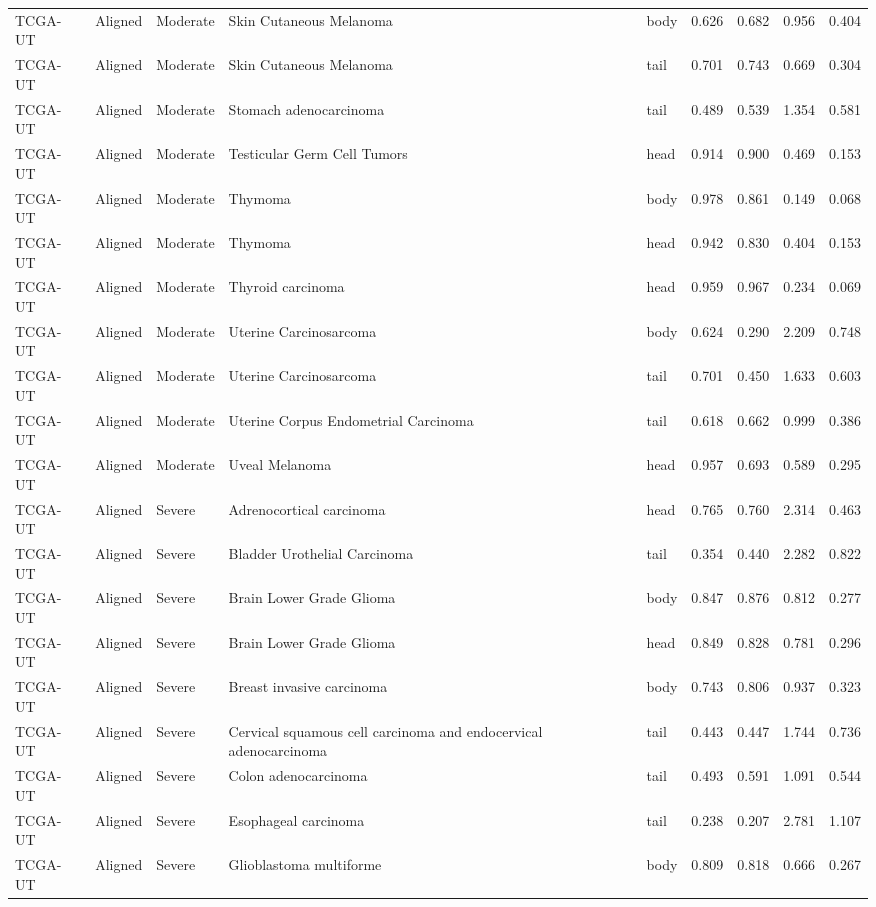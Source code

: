 \begin{longtable}{lllllrrrr}
TCGA-UT & Aligned & Moderate & Skin Cutaneous Melanoma & body & 0.626 & 0.682 & 0.956 & 0.404 \\
TCGA-UT & Aligned & Moderate & Skin Cutaneous Melanoma & tail & 0.701 & 0.743 & 0.669 & 0.304 \\
TCGA-UT & Aligned & Moderate & Stomach adenocarcinoma & tail & 0.489 & 0.539 & 1.354 & 0.581 \\
TCGA-UT & Aligned & Moderate & Testicular Germ Cell Tumors & head & 0.914 & 0.900 & 0.469 & 0.153 \\
TCGA-UT & Aligned & Moderate & Thymoma & body & 0.978 & 0.861 & 0.149 & 0.068 \\
TCGA-UT & Aligned & Moderate & Thymoma & head & 0.942 & 0.830 & 0.404 & 0.153 \\
TCGA-UT & Aligned & Moderate & Thyroid carcinoma & head & 0.959 & 0.967 & 0.234 & 0.069 \\
TCGA-UT & Aligned & Moderate & Uterine Carcinosarcoma & body & 0.624 & 0.290 & 2.209 & 0.748 \\
TCGA-UT & Aligned & Moderate & Uterine Carcinosarcoma & tail & 0.701 & 0.450 & 1.633 & 0.603 \\
TCGA-UT & Aligned & Moderate & Uterine Corpus Endometrial Carcinoma & tail & 0.618 & 0.662 & 0.999 & 0.386 \\
TCGA-UT & Aligned & Moderate & Uveal Melanoma & head & 0.957 & 0.693 & 0.589 & 0.295 \\
TCGA-UT & Aligned & Severe & Adrenocortical carcinoma & head & 0.765 & 0.760 & 2.314 & 0.463 \\
TCGA-UT & Aligned & Severe & Bladder Urothelial Carcinoma & tail & 0.354 & 0.440 & 2.282 & 0.822 \\
TCGA-UT & Aligned & Severe & Brain Lower Grade Glioma & body & 0.847 & 0.876 & 0.812 & 0.277 \\
TCGA-UT & Aligned & Severe & Brain Lower Grade Glioma & head & 0.849 & 0.828 & 0.781 & 0.296 \\
TCGA-UT & Aligned & Severe & Breast invasive carcinoma & body & 0.743 & 0.806 & 0.937 & 0.323 \\
TCGA-UT & Aligned & Severe & Cervical squamous cell carcinoma and endocervical adenocarcinoma & tail & 0.443 & 0.447 & 1.744 & 0.736 \\
TCGA-UT & Aligned & Severe & Colon adenocarcinoma & tail & 0.493 & 0.591 & 1.091 & 0.544 \\
TCGA-UT & Aligned & Severe & Esophageal carcinoma & tail & 0.238 & 0.207 & 2.781 & 1.107 \\
TCGA-UT & Aligned & Severe & Glioblastoma multiforme & body & 0.809 & 0.818 & 0.666 & 0.267 \\

\end{longtable}
